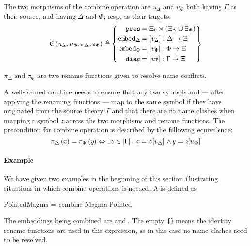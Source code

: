 The two morphisms of the combine operation are $u_{\Delta}$ and $u_{\Phi}$ both having $\Gamma$ as their source, and having $\Delta$ and $\Phi$, resp, as their targets. 
\[
\mathfrak{C}\left( u_{\Delta}, u_{\Phi}, \pi_{\Delta}, \pi_{\Phi}\right) \triangleq
\left\{\begin{aligned}
\mathtt{pres} & = \Xi_0\rtimes\left(\Xi_{\Delta} \cup \Xi_{\Phi}\right) \\
\mathtt{embed}_{\Delta} & = \left[v_{\Delta}\right] : \Delta\rightarrow\Xi\\
\mathtt{embed}_{\Phi} & = \left[v_{\Phi}\right] : \Phi\rightarrow\Xi\\
\mathtt{diag} & = \left[uv\right]:\Gamma\rightarrow\Xi\\
\end{aligned}\right\}\]
 
$\pi_{\Delta}$ and $\pi_{\Phi}$ are two rename functions given to resolve name conflicts. 

\noindent A well-formed combine needs to ensure that any two symbols  and  --- after applying the renaming functions --- map to the same symbol if they have originated from the source theory $\Gamma$ and that there are no name clashes when mapping a symbol $z$ across the two morphisms and rename functions.  The precondition for combine operation is described by the following equivalence: 
\begin{equation}
\pi_{\Delta} \left( x \right) = \pi_{\Phi} \left( y \right)
\Leftrightarrow \exists z \in \left| \Gamma \right|.\ x =
z[ u_{\Delta}]_{} \wedge y = z[ u_{\Phi}]_{} 
\label{eq:combinePrecond}
\end{equation}

\paragraph{Example}
We have given two examples in the beginning of this section illustrating situations in which combine operations is needed. A  is defined as 
\begin{togcode} 
PointedMagma = combine Magma {} Pointed {} 
\end{togcode} 
The embeddings being combined are  and . The empty 
\lstinline|{}| means the identity rename functions are used in this expression, as in this case no name clashes need to be resolved. 

